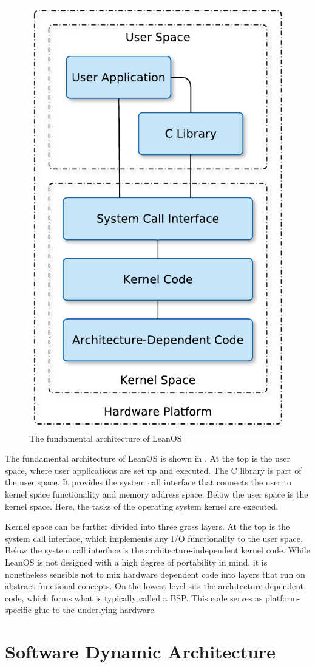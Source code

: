 \begin{figure}[htb]
\begin{center}
	\includegraphics[width=0.4\columnwidth]{images/OS_fundamental_architecture}
	\caption{The fundamental architecture of LeanOS}
	\label{fig:fundamental_architecture}
\end{center}
\end{figure}

The fundamental architecture of LeanOS is shown in
. At the top is the user space, where user
applications are set up and executed. The C library is part of the user space.
It provides the system call interface that connects the user to kernel space
functionality and memory address space. Below the user space is the kernel
space. Here, the tasks of the operating system kernel are executed.

Kernel space can be further divided into three gross layers. At the top is the
system call interface, which implements any I/O functionality to the user space.
Below the system call interface is the architecture-independent kernel code.
While LeanOS is not designed with a high degree of portability in mind, it is
nonetheless sensible not to mix hardware dependent code into layers that run
on abstract functional concepts. On the lowest level sits the
architecture-dependent code, which forms what is typically called a \gls{BSP}.
This code serves as platform-specific glue to the underlying hardware.


\section{Software Dynamic Architecture}

